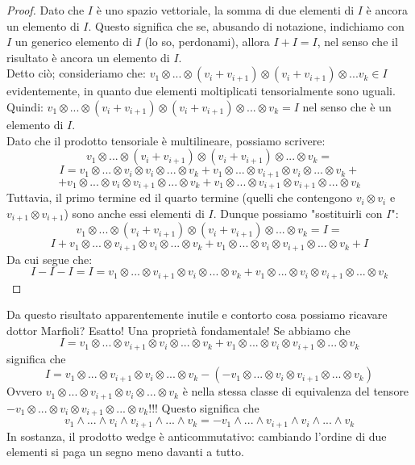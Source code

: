 \documentclass[12pt,a4paper]{report}
\theoremstyle{definition}
\theoremstyle{Theorem}
\theoremstyle{definition}
\theoremstyle{definition}
\theoremstyle{definition}
\begin{document}
	\begin{proof}
		Dato che $I$ è uno spazio vettoriale, la somma di due elementi di $I$ è ancora un elemento di $I$. Questo significa che se, abusando di notazione, indichiamo con $I$ un generico elemento di $I$ (lo so, perdonami), allora $I+I=I$, nel senso che il risultato è ancora un elemento di $I$.\\
		Detto ciò; consideriamo che:
		$v_1\otimes ...\otimes (v_i+v_{i+1})\otimes(v_i+v_{i+1}) \otimes... v_k\in I$ evidentemente, in quanto due elementi moltiplicati tensorialmente sono uguali. Quindi: $v_1\otimes ...\otimes (v_i+v_{i+1})\otimes(v_i+v_{i+1}) \otimes... \otimes v_k=I$ nel senso che è un elemento di $I$.\\
		Dato che il prodotto tensoriale è multilineare, possiamo scrivere:
		$$v_1\otimes ...\otimes (v_i+v_{i+1})\otimes(v_i+v_{i+1}) \otimes... \otimes v_k=$$
		$$I=v_1\otimes ...\otimes v_i\otimes v_i\otimes... \otimes v_k+v_1\otimes ...\otimes v_{i+1}\otimes v_i\otimes... \otimes v_k+$$
		$$+v_1\otimes ...\otimes v_i\otimes v_{i+1}\otimes...\otimes v_k+v_1\otimes ...\otimes v_{i+1}\otimes v_{i+1}\otimes...\otimes v_k$$
		Tuttavia, il primo termine ed il quarto termine (quelli che contengono $v_i\otimes v_i$ e $v_{i+1}\otimes v_{i+1}$) sono anche essi elementi di $I$. Dunque possiamo "sostituirli con $I$":
		$$v_1\otimes ...\otimes (v_i+v_{i+1})\otimes(v_i+v_{i+1}) \otimes... \otimes v_k=I=$$
		$$I+v_1\otimes ...\otimes v_{i+1}\otimes v_i\otimes... \otimes v_k+v_1\otimes ...\otimes v_i\otimes v_{i+1}\otimes...\otimes v_k+I$$
		Da cui segue che:
		$$I-I-I=I=v_1\otimes ...\otimes v_{i+1}\otimes v_i\otimes... \otimes v_k+v_1\otimes ...\otimes v_i\otimes v_{i+1}\otimes...\otimes v_k$$
	\end{proof}
	Da questo risultato apparentemente inutile e contorto cosa possiamo ricavare dottor Marfioli? Esatto! Una proprietà fondamentale! Se abbiamo che
	$$I=v_1\otimes ...\otimes v_{i+1}\otimes v_i\otimes... \otimes v_k+v_1\otimes ...\otimes v_i\otimes v_{i+1}\otimes...\otimes v_k$$
	significa che
	$$I=v_1\otimes ...\otimes v_{i+1}\otimes v_i\otimes... \otimes v_k-(-v_1\otimes ...\otimes v_i\otimes v_{i+1}\otimes...\otimes v_k)$$
	Ovvero $v_1\otimes ...\otimes v_{i+1}\otimes v_i\otimes... \otimes v_k$ è nella stessa classe di equivalenza del tensore $-v_1\otimes ...\otimes v_i\otimes v_{i+1}\otimes...\otimes v_k$!!!
	Questo significa che $$v_1\wedge ...\wedge v_i\wedge v_{i+1}\wedge...\wedge v_k=-v_1\wedge ...\wedge v_{i+1}\wedge v_{i}\wedge...\wedge v_k$$ 
	In sostanza, il prodotto wedge è anticommutativo: cambiando l'ordine di due elementi si paga un segno meno davanti a tutto.
\end{document}
